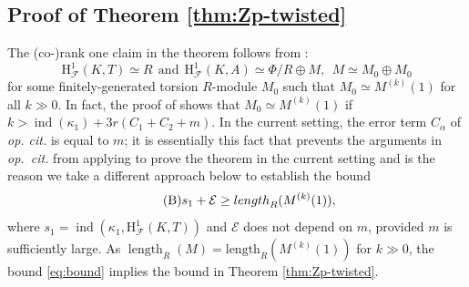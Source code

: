 \documentclass[a4paper,10pt]{amsart}
\numberwithin{equation}{section}
\numberwithin{equation}{section}
\theoremstyle{plain}
\theoremstyle{definition}
\theoremstyle{definition}
\theoremstyle{plain}
\theoremstyle{plain}
\theoremstyle{plain}
\theoremstyle{plain}
\newcommand{\ind}{\operatorname{ind}}
\newcommand{\CE}{\mathcal{E}}
\DeclareMathOperator{\length}{length}
\newcommand{\CF}{\mathcal{F}}
\newcommand{\Fcal}{\mathcal{F}}
\newcommand{\rH}{\mathrm{H}}
\begin{document}
\subsection{Proof of Theorem \ref{thm:Zp-twisted}}\label{secproofkoly}
The (co-)rank one claim in the theorem follows from \cite[Thm.~3.3.8]{eisenstein}: 
$$
\rH^1_\CF(K,T)\simeq R \ \ \text{and} \ \ \rH^1_\CF(K,A) \simeq \Phi/R \oplus M, \ \ M \simeq M_0\oplus M_0
$$
for some finitely-generated torsion $R$-module $M_0$ such that $M_0\simeq M^{(k)}(1)$ for all $k\gg 0$.
In fact, the proof of  \cite[Thm.~3.3.8]{eisenstein} shows that $M_0\simeq M^{(k)}(1)$ if $k>{\ind(\kappa_{1})+3r(C_1+C_2+m)}$.
In the current setting, the error term $C_{\alpha}$ of \emph{op. cit.} is equal to $m$; it is essentially this fact that prevents the arguments in {\em op.~cit.} from applying to prove the theorem in the current setting and is the reason we take a different approach below
to establish the bound 
\begin{equation}\label{eq:bound}
\tag{B}
s_1+\CE\geq {\rm length}_{R}(M^{(k)}(1)),
\end{equation}
where $s_1=\ind(\kappa_{1},\rH^1_{\Fcal}(K,T))$ and $\CE$ does not depend on $m$, provided $m$ is sufficiently large. 
As $\mathrm{\length}_R(M) = \mathrm{length}_R(M^{(k)}(1))$ for $k\gg 0$, the bound \eqref{eq:bound} implies 
the bound in Theorem \ref{thm:Zp-twisted}.
\end{document}
